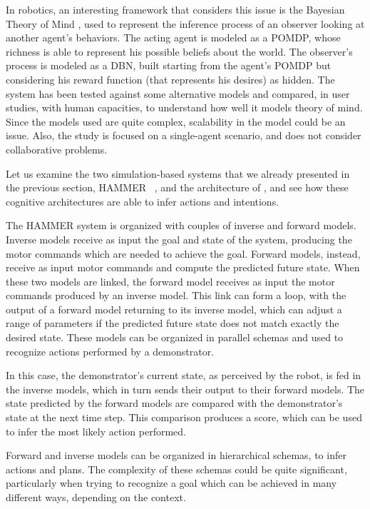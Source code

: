 In robotics, an interesting framework that considers this issue is the Bayesian Theory of Mind \cite{baker2014modeling}, used to represent the inference process of an observer looking at another agent's behaviors. The acting agent is modeled as a POMDP, whose richness is able to represent his possible beliefs about the world. The observer's process is modeled as a DBN, built starting from the agent's POMDP but considering his reward function (that represents his desires) as hidden. The system has been tested against some alternative models and compared, in user studies, with human capacities, to understand how well it models theory of mind. Since the models used are quite complex, scalability in the model could be an issue. Also, the study is focused on a single-agent scenario, and does not consider collaborative problems.

Let us examine the two simulation-based systems that we already presented in the previous section, HAMMER ~\cite{demiris2007prediction}, and the architecture of \cite{BreazealGB09}, and see how these cognitive architectures are able to infer actions and intentions.

The HAMMER system is organized with couples of inverse and forward models.  Inverse models receive as input the goal and state of the system, producing the motor commands which are needed to achieve the goal. Forward models, instead, receive as input motor commands and compute the predicted future state. When these two models are linked, the forward model receives as input the motor commands produced by an inverse model. This link can form a loop, with the output of a forward model returning to its inverse model, which can adjust a range of parameters if the predicted future state does not match exactly the desired state. These models can be organized in parallel schemas and used to recognize actions performed by a demonstrator. 

In this case, the demonstrator's current state, as perceived by the robot, is fed in the inverse models, which in turn sends their output to their forward models. The state predicted by the forward models are compared with the demonstrator's state at the next time step. This comparison produces a score, which can be used to infer the most likely action performed. 

Forward and inverse models can be organized in hierarchical schemas, to infer actions and plans. The complexity of these schemas could be quite significant, particularly when trying to recognize a goal which can be achieved in many different ways, depending on the context. 

